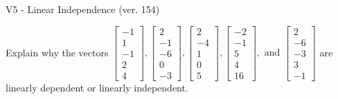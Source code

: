 \begin{exercise}
  \begin{exerciseTitle}V5 - Linear Independence (ver. 154)\end{exerciseTitle}
  \begin{exerciseStatement}
    Explain why the vectors \(\left[\begin{array}{r}
-1 \\
1 \\
-1 \\
2 \\
4
\end{array}\right] , \left[\begin{array}{r}
2 \\
-1 \\
-6 \\
0 \\
-3
\end{array}\right] , \left[\begin{array}{r}
2 \\
-4 \\
1 \\
0 \\
5
\end{array}\right] , \left[\begin{array}{r}
-2 \\
-1 \\
5 \\
4 \\
16
\end{array}\right] , \text{ and } \left[\begin{array}{r}
2 \\
-6 \\
-3 \\
3 \\
-1
\end{array}\right]\) are linearly dependent or linearly independent.	



\end{exerciseStatement}
\end{exercise}
